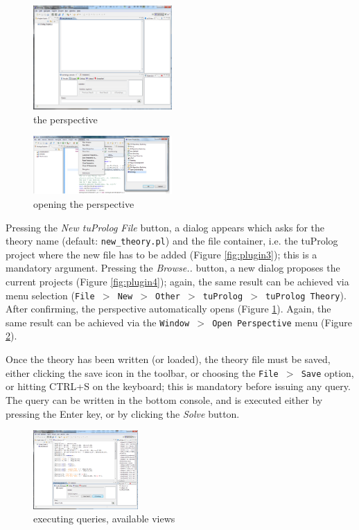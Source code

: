 \begin{figure}
\centering
  \includegraphics[width=200px]{images/plugin5.png}
  \caption{the \tuprolog{} perspective}\label{fig:plugin5}
\end{figure}

\begin{figure}
\centering
  \includegraphics[width=200px]{images/plugin6.png}
  \caption{opening the \tuprolog{} perspective}\label{fig:plugin6}
\end{figure}

Pressing the \textit{New tuProlog File} button, a dialog appears which asks for the theory name (default: \texttt{new\_theory.pl}) and the file container, i.e. the tuProlog project where the new file has to be added (Figure \ref{fig:plugin3}); this is a mandatory argument. Pressing the \textit{Browse..} button, a new dialog proposes the current \tuprolog{} projects (Figure \ref{fig:plugin4}); again, the same result can be achieved via menu selection  (\texttt{File $>$ New $>$ Other $>$ tuProlog $>$ tuProlog Theory}). After confirming, the \tuprolog{} perspective automatically opens (Figure \ref{fig:plugin5}). Again, the same result can be achieved via the \texttt{Window $>$ Open Perspective} menu (Figure \ref{fig:plugin6}).

Once the theory has been written (or loaded), the theory file must be saved, either clicking the save icon in the toolbar, or choosing the \texttt{File $>$ Save} option, or hitting CTRL+S on the keyboard; this is mandatory before issuing any query.
The query can be written in the bottom console, and is executed either by pressing the Enter key, or by clicking the \textit{Solve} button.


\begin{figure}
\centering
  \includegraphics[width=4cm]{images/plugin7.png}
  \caption{executing queries, available views}\label{fig:plugin7}
\end{figure}

